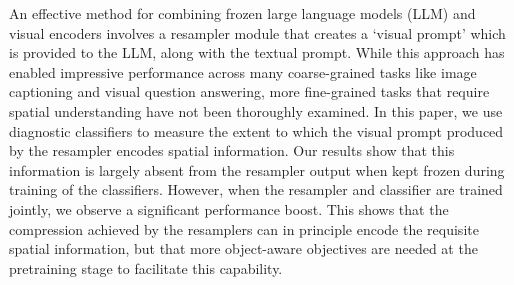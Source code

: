 An effective method for combining frozen large language models (LLM) and visual encoders involves a resampler module that creates a `visual prompt' which is provided to the LLM, along with the textual prompt. While this approach has enabled impressive performance across many coarse-grained tasks like image captioning and visual question answering, more fine-grained tasks that require spatial understanding have not been thoroughly examined. In this paper, we use diagnostic classifiers to measure the extent to which the visual prompt produced by the resampler encodes spatial information. Our results show that this information is largely absent from the resampler output when kept frozen during training of the classifiers. However, when the resampler and classifier are trained jointly, we observe a significant performance boost. This shows that the compression achieved by the resamplers can in principle encode the requisite spatial information, but that more object-aware objectives are needed at the pretraining stage to facilitate this capability.
